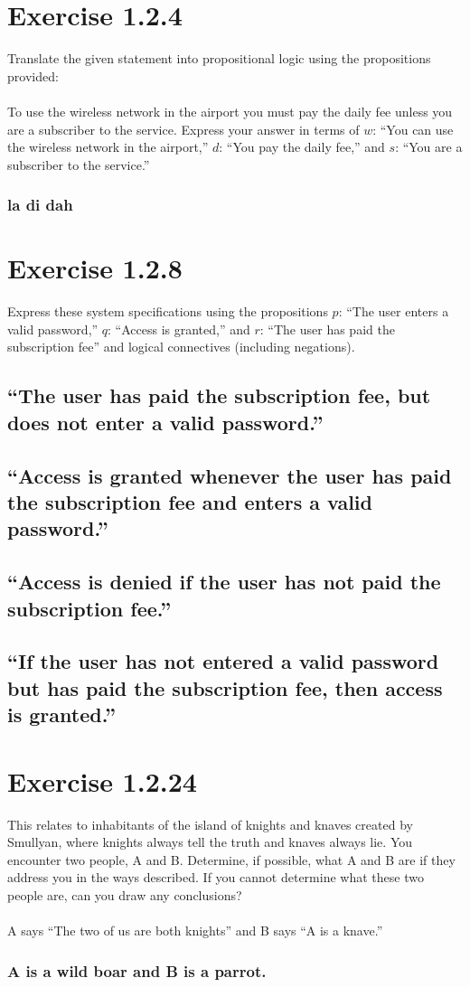 \documentclass[letter]{article}
\newcommand{\problemnumber}[1] {\filbreak\section{#1}}
\newcommand{\question}[1] {\subsection{#1}}
\newcommand{\answer}[1] {\subsubsection{#1}}
\begin{document}
\problemnumber{Exercise 1.2.4}{Translate the given statement into propositional
logic using the propositions provided:
\\ \\ To use the wireless network in the airport you must pay
the daily fee unless you are a subscriber to the service.
Express your answer in terms of $w$: “You can use the
wireless network in the airport,” $d$: “You pay the daily
fee,” and $s$: “You are a subscriber to the service.”}
\answer{la di dah}

\problemnumber{Exercise 1.2.8}{Express these system specifications using the propositions
$p$: “The user enters a valid password,” $q$: “Access
is granted,” and $r$: “The user has paid the subscription
fee” and logical connectives (including negations).}
\question{“The user has paid the subscription fee, but does not
enter a valid password.”}
\question{“Access is granted whenever the user has paid the
subscription fee and enters a valid password.”}
\question{“Access is denied if the user has not paid the subscription
fee.”}
\question{“If the user has not entered a valid password but has
paid the subscription fee, then access is granted.”}


\problemnumber{Exercise 1.2.24}{This relates to inhabitants of the island of knights
and knaves created by Smullyan, where knights always tell the
truth and knaves always lie. You encounter two people, A and
B. Determine, if possible, what A and B are if they address you
in the ways described. If you cannot determine what these two
people are, can you draw any conclusions?
\\ \\ A says “The two of us are both knights” and B says “A is
a knave.”}
\answer{A is a wild boar and B is a parrot.}
\end{document}
